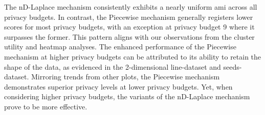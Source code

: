 The nD-Laplace mechanism consistently exhibits a nearly uniform \gls{ami} across all privacy budgets. In contrast, the Piecewise mechanism generally registers lower scores for most privacy budgets, with an exception at privacy budget 9 where it surpasses the former. This pattern aligns with our observations from the cluster utility and heatmap analyses. The enhanced performance of the Piecewise mechanism at higher privacy budgets can be attributed to its ability to retain the shape of the data, as evidenced in the 2-dimensional line-dataset and seeds-dataset. Mirroring trends from other plots, the Piecewise mechanism demonstrates superior privacy levels at lower privacy budgets. Yet, when considering higher privacy budgets, the variants of the nD-Laplace mechanism prove to be more effective.
\newpage



